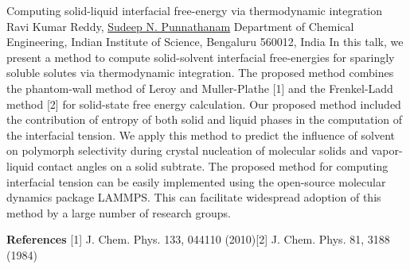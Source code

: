 
    \begin{abstract_online}{Computing solid-liquid interfacial free-energy via thermodynamic integration}{%
        Ravi Kumar Reddy, \underline{Sudeep N. Punnathanam}}{%
        \IStag}{%
        Department of Chemical Engineering, Indian Institute of Science, Bengaluru 560012, India}
    In this talk, we present a method to compute solid-solvent interfacial free-energies for sparingly soluble solutes via thermodynamic integration. The proposed method combines the phantom-wall method of Leroy and Muller-Plathe [1] and the Frenkel-Ladd method [2] for solid-state free energy calculation. Our proposed method included the contribution of entropy of both solid and liquid phases in the computation of the interfacial tension. We apply this method to predict the influence of solvent on polymorph selectivity during crystal nucleation of molecular solids and vapor-liquid contact angles on a solid subtrate. The proposed method for computing interfacial tension can be easily implemented using the open-source molecular dynamics package LAMMPS. This can facilitate widespread adoption of this method by a large number of research groups. 
    
        \textbf{References} \newline{}[1] J. Chem. Phys. 133, 044110 (2010)\newline{}[2] J. Chem. Phys. 81, 3188 (1984)
    \end{abstract_online}
    